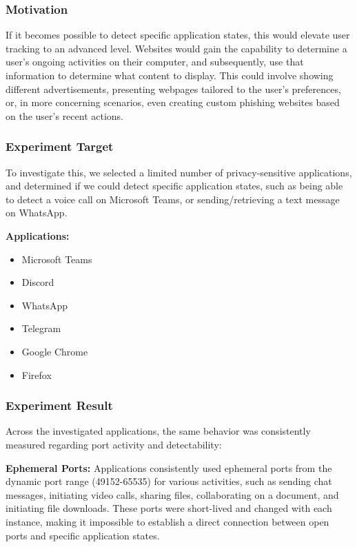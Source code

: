 \subsubsection{Motivation}

If it becomes possible to detect specific application states, this would elevate user tracking to an advanced level. Websites would gain the capability to determine a user's ongoing activities on their computer, and subsequently, use that information to determine what content to display. This could involve showing different advertisements, presenting webpages tailored to the user's preferences, or, in more concerning scenarios, even creating custom phishing websites based on the user's recent actions.

\subsubsection{Experiment Target}

To investigate this, we selected a limited number of privacy-sensitive applications, and determined if we could detect specific application states, 
such as being able to detect a voice call on Microsoft Teams, or sending/retrieving a text message on WhatsApp.

\textbf{Applications:}
\begin{itemize}
    \item Microsoft Teams
    \item Discord
    \item WhatsApp
    \item Telegram
    \item Google Chrome
    \item Firefox
\end{itemize}

\subsubsection{Experiment Result}

Across the investigated applications, the same behavior was consistently measured regarding port activity and detectability:

\textbf{Ephemeral Ports:} Applications consistently used ephemeral ports from the dynamic port range (49152-65535) for various activities, such as sending chat messages, initiating video calls, sharing files, collaborating on a document, and initiating file downloads. These ports were short-lived and changed with each instance, making it impossible to establish a direct connection between open ports and specific application states.

